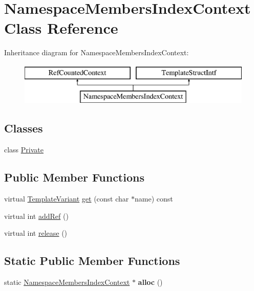 \hypertarget{class_namespace_members_index_context}{}\section{Namespace\+Members\+Index\+Context Class Reference}
\label{class_namespace_members_index_context}
Inheritance diagram for Namespace\+Members\+Index\+Context\+:\begin{figure}[H]
\begin{center}
\leavevmode
\includegraphics[height=2.000000cm]{class_namespace_members_index_context}
\end{center}
\end{figure}
\subsection*{Classes}
\begin{DoxyCompactItemize}
\item 
class \mbox{\hyperlink{class_namespace_members_index_context_1_1_private}{Private}}
\end{DoxyCompactItemize}
\subsection*{Public Member Functions}
\begin{DoxyCompactItemize}
\item 
virtual \mbox{\hyperlink{class_template_variant}{Template\+Variant}} \mbox{\hyperlink{class_namespace_members_index_context_aad2cfedc7254b9cd95c51e9d82968151}{get}} (const char $\ast$name) const
\item 
virtual int \mbox{\hyperlink{class_namespace_members_index_context_a48abb994ec8b22e257d71077f11bd75e}{add\+Ref}} ()
\item 
virtual int \mbox{\hyperlink{class_namespace_members_index_context_aa80fcd8abd99dbf8f067ec0dec4d52a8}{release}} ()
\end{DoxyCompactItemize}
\subsection*{Static Public Member Functions}
\begin{DoxyCompactItemize}
\item 
\mbox{\label{class_namespace_members_index_context_a580c785b2f59d7034876f28046ffc38c}} 
static \mbox{\hyperlink{class_namespace_members_index_context}{Namespace\+Members\+Index\+Context}} $\ast$ {\bfseries alloc} ()
\end{DoxyCompactItemize}


